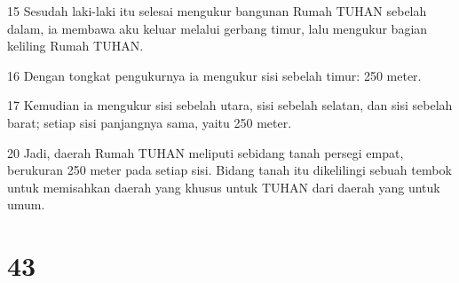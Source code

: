 \par 15 Sesudah laki-laki itu selesai mengukur bangunan Rumah TUHAN sebelah dalam, ia membawa aku keluar melalui gerbang timur, lalu mengukur bagian keliling Rumah TUHAN.
\par 16 Dengan tongkat pengukurnya ia mengukur sisi sebelah timur: 250 meter.
\par 17 Kemudian ia mengukur sisi sebelah utara, sisi sebelah selatan, dan sisi sebelah barat; setiap sisi panjangnya sama, yaitu 250 meter.
\par 20 Jadi, daerah Rumah TUHAN meliputi sebidang tanah persegi empat, berukuran 250 meter pada setiap sisi. Bidang tanah itu dikelilingi sebuah tembok untuk memisahkan daerah yang khusus untuk TUHAN dari daerah yang untuk umum.

\chapter{43}

